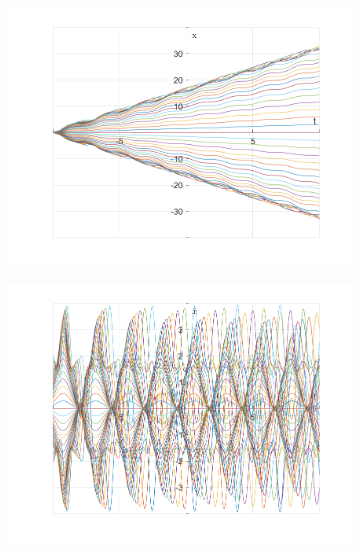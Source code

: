 \documentclass{article}
\begin{document}
	\begin{figure}[h!]
		\centering
		\begin{subfigure}[b]{0.48\linewidth}
			\includegraphics[width=\linewidth]{./SmallOscillations/Chaotic/F3.png}
		\end{subfigure}
		\begin{subfigure}[b]{0.48\linewidth}
			\includegraphics[width=\linewidth]{./SmallOscillations/Chaotic/F4.png}
		\end{subfigure}
	\end{figure}
\end{document}
